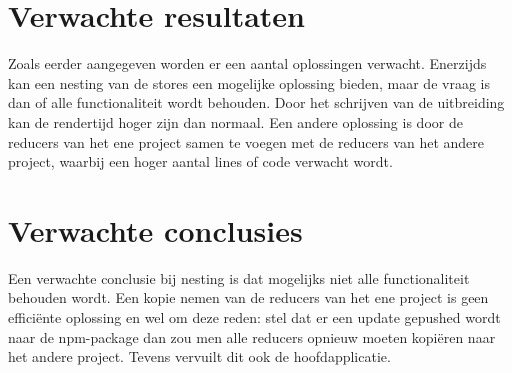 \section{Verwachte resultaten}
\label{sec:verwachte_resultaten}

Zoals eerder aangegeven worden er een aantal oplossingen verwacht. Enerzijds kan een nesting van de stores een mogelijke oplossing bieden, maar de vraag is dan of alle functionaliteit wordt behouden. Door het schrijven van de uitbreiding kan de rendertijd hoger zijn dan normaal. Een andere oplossing is door de reducers van het ene project samen te voegen met de reducers van het andere project, waarbij een hoger aantal lines of code verwacht wordt.

\section{Verwachte conclusies}
\label{sec:verwachte_conclusies}

Een verwachte conclusie bij nesting is dat mogelijks niet alle functionaliteit behouden wordt. Een kopie nemen van de reducers van het ene project is geen efficiënte oplossing en wel om deze reden: stel dat er een update gepushed wordt naar de npm-package dan zou men alle reducers opnieuw moeten kopiëren naar het andere project. Tevens vervuilt dit ook de hoofdapplicatie. 